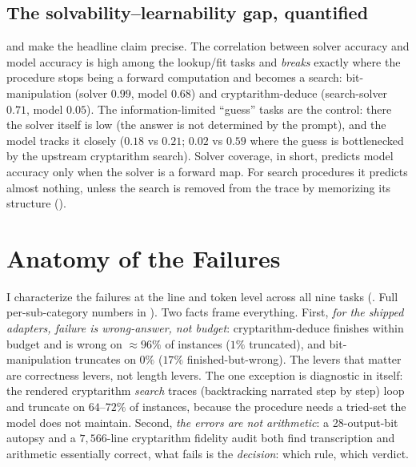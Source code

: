 \documentclass[11pt]{article}
\begin{document}
\subsection{The solvability--learnability gap, quantified}
\label{sec:res-gap}

 and  make the headline claim precise. The correlation
between solver accuracy and model accuracy is high among the lookup/fit tasks and
\emph{breaks} exactly where the procedure stops being a forward computation and becomes a
search: bit-manipulation (solver $0.99$, model $0.68$) and cryptarithm-deduce (search-solver
$0.71$, model $0.05$). The information-limited ``guess'' tasks are the control: there the
solver itself is low (the answer is not determined by the prompt), and the model tracks it
closely ($0.18$ vs $0.21$; $0.02$ vs $0.59$ where the guess is bottlenecked by the
upstream cryptarithm search). Solver coverage, in short, predicts model accuracy only when
the solver is a forward map. For search procedures it predicts almost nothing, unless the search
is removed from the trace by memorizing its structure ().

\section{Anatomy of the Failures}
\label{sec:anatomy}

I characterize the failures at the line and token level across all nine tasks
(. Full per-sub-category numbers in ). Two facts
frame everything. First, \emph{for the shipped adapters, failure is wrong-answer, not
budget}: cryptarithm-deduce finishes within budget and is wrong on $\approx\!96\%$ of
instances ($1\%$ truncated), and bit-manipulation truncates on $0\%$ ($17\%$
finished-but-wrong). The levers that matter are correctness levers, not length levers. The
one exception is diagnostic in itself: the rendered cryptarithm \emph{search} traces
(backtracking narrated step by step) loop and truncate on $64$--$72\%$ of instances, because
the procedure needs a tried-set the model does not maintain. Second, \emph{the errors are
not arithmetic}: a 28-output-bit autopsy and a $7{,}566$-line cryptarithm fidelity audit both
find transcription and arithmetic essentially correct, what fails is the \emph{decision}:
which rule, which verdict.
\end{document}
